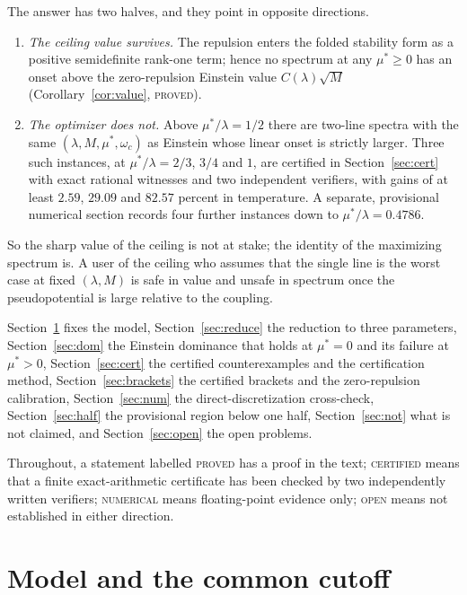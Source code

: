 \documentclass[11pt]{article}
\newcommand{\muS}{\mu^{*}}
\theoremstyle{definition}
\theoremstyle{remark}
\begin{document}
The answer has two halves, and they point in opposite directions.
\begin{enumerate}[label=(\arabic*),leftmargin=2.2em]
\item \emph{The ceiling value survives.} The repulsion enters the folded stability form
as a positive semidefinite rank-one term; hence no spectrum at any $\muS\ge0$ has an
onset above the zero-repulsion Einstein value $C(\lambda)\sqrt M$
(Corollary~\ref{cor:value}, \textsc{proved}).
\item \emph{The optimizer does not.} Above $\muS/\lambda=1/2$ there are two-line spectra
with the same $(\lambda,M,\muS,\omega_c)$ as Einstein whose linear onset is strictly
larger. Three such instances, at $\muS/\lambda=2/3$, $3/4$ and $1$, are certified in
Section~\ref{sec:cert} with exact rational witnesses and two independent verifiers, with
gains of at least $2.59$, $29.09$ and $82.57$ percent in temperature. A separate, provisional
numerical section records four further instances down to $\muS/\lambda=0.4786$.
\end{enumerate}
So the sharp value of the ceiling is not at stake; the identity of the maximizing spectrum
is. A user of the ceiling who assumes that the single line is the worst case at fixed
$(\lambda,M)$ is safe in value and unsafe in spectrum once the pseudopotential is large
relative to the coupling.

Section~\ref{sec:model} fixes the model, Section~\ref{sec:reduce} the reduction to three
parameters, Section~\ref{sec:dom} the Einstein dominance that holds at $\muS=0$ and its
failure at $\muS>0$, Section~\ref{sec:cert} the certified counterexamples and the
certification method, Section~\ref{sec:brackets} the certified brackets and the
zero-repulsion calibration, Section~\ref{sec:num} the direct-discretization cross-check,
Section~\ref{sec:half} the provisional region below one half, Section~\ref{sec:not} what is
not claimed, and Section~\ref{sec:open} the open problems.

Throughout, a statement labelled \textsc{proved} has a proof in the text;
\textsc{certified} means that a finite exact-arithmetic certificate has been checked by
two independently written verifiers; \textsc{numerical} means floating-point evidence
only; \textsc{open} means not established in either direction.

\section{Model and the common cutoff}\label{sec:model}
\end{document}
